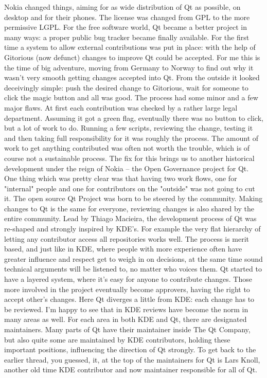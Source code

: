 Nokia changed things, aiming for as wide distribution of Qt as possible, on desktop and for their phones. The license was changed from GPL to the more permissive LGPL. For the free software world, Qt became a better project in many ways: a proper public bug tracker became finally available. For the first time a system to allow external contributions was put in place: with the help of Gitorious (now defunct) changes to improve Qt could be accepted. For me this is the time of big adventure, moving from Germany to Norway to find out why it wasn't very smooth getting changes accepted into Qt. From the outside it looked deceivingly simple: push the desired change to Gitorious, wait for someone to click the magic button and all was good. The process had some minor and a few major flaws. At first each contribution was checked by a rather large legal department. Assuming it got a green flag, eventually there was no button to click, but a lot of work to do. Running a few scripts, reviewing the change, testing it and then taking full responsibility for it was roughly the process. The amount of work to get anything contributed was often not worth the trouble, which is of course not a sustainable process. The fix for this brings us to another historical development under the reign of Nokia – the Open Governance project for Qt. One thing which was pretty clear was that having two work flows, one for "internal" people and one for contributors on the "outside" was not going to cut it. The open source Qt Project was born to be steered by the community. Making changes to Qt is the same for everyone, reviewing changes is also shared by the entire community. Lead by Thiago Macieira, the development process of Qt was re-shaped and strongly inspired by KDE’s. For example the very flat hierarchy of letting any contributor access all repositories works well. The process is merit based, and just like in KDE, where people with more experience often have greater influence and respect get to weigh in on decisions, at the same time sound technical arguments will be listened to, no matter who voices them. Qt started to have a layered system, where it’s easy for anyone to contribute changes. Those more involved in the project eventually become approvers, having the right to accept other’s changes. Here Qt diverges a little from KDE: each change has to be reviewed. I'm happy to see that in KDE reviews have become the norm in many areas as well. For each area in both KDE and Qt, there are designated maintainers. Many parts of Qt have their maintainer inside The Qt Company, but also quite some are maintained by KDE contributors, holding these important positions, influencing the direction of Qt strongly. To get back to the earlier thread, you guessed, it, at the top of the maintainers for Qt is Lars Knoll, another old time KDE contributor and now maintainer responsible for all of Qt.

